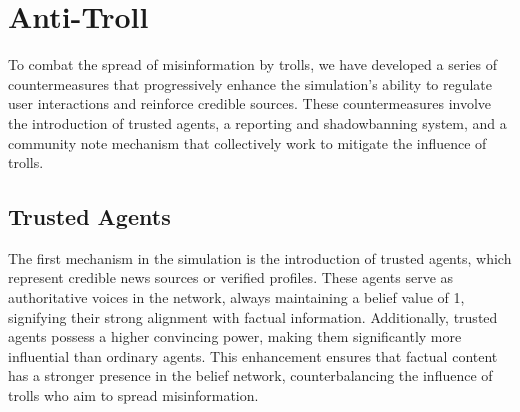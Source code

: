 \documentclass[a4paper,11pt]{scrartcl}
\begin{document}
\section{Anti-Troll}
To combat the spread of misinformation by trolls, we have developed a series of countermeasures that progressively enhance the simulation's ability to regulate user interactions and reinforce credible sources. These countermeasures involve the introduction of trusted agents, a reporting and shadowbanning system, and a community note mechanism that collectively work to mitigate the influence of trolls.
\subsection{Trusted Agents}
The first mechanism in the simulation is the introduction of trusted agents, which represent credible news sources or verified profiles. These agents serve as authoritative voices in the network, always maintaining a belief value of 1, signifying their strong alignment with factual information. Additionally, trusted agents possess a higher convincing power, making them significantly more influential than ordinary agents. This enhancement ensures that factual content has a stronger presence in the belief network, counterbalancing the influence of trolls who aim to spread misinformation.
\end{document}
